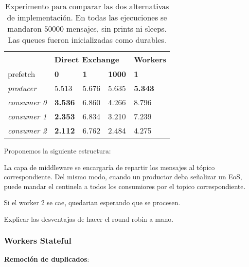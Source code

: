 \documentclass[titlepage,a4paper,oneside]{article}
\begin{document}
\begin{table}[]
\centering
\begin{tabular}{l|llll|}
\cline{2-5}
\cellcolor[HTML]{FFFFFF}                  & \multicolumn{3}{l|}{\textbf{Direct Exchange}} & \textbf{Workers} \\ \hline
\multicolumn{1}{|l|}{prefetch} & \multicolumn{1}{l|}{\textbf{0}} & \multicolumn{1}{l|}{\textbf{1}} & \multicolumn{1}{l|}{\textbf{1000}} & \textbf{1} \\ \hline
\multicolumn{1}{|l|}{\textit{producer}}   & 5.513               & 5.676      & 5.635      & \textbf{5.343}   \\
\multicolumn{1}{|l|}{\textit{consumer 0}} & \textbf{3.536}      & 6.860      & 4.266      & 8.796            \\
\multicolumn{1}{|l|}{\textit{consumer 1}} & \textbf{2.353}      & 6.834      & 3.210      & 7.239            \\
\multicolumn{1}{|l|}{\textit{consumer 2}} & \textbf{2.112}      & 6.762      & 2.484      & 4.275            \\ \hline
\end{tabular}
\caption{Experimento para comparar las dos alternativas de implementación. En todas las ejecuciones se mandaron $50000$ mensajes, sin prints ni sleeps. Las queues fueron inicializadas como durables.}
\label{exp-dex-wrk}
\end{table}

Proponemos la siguiente estructura:

La capa de middleware se encargaría de repartir los mensajes al tópico correspondiente. Del mismo modo, cuando un productor deba señalizar un EoS, puede mandar el centinela a todos los consumiores por el topico correspondiente.

Si el worker 2 se cae, quedarian esperando que se procesen.

Explicar las desventajas de hacer el round robin a mano.

\subsubsection{Workers Stateful}




\textbf{Remoción de duplicados}:
\end{document}
